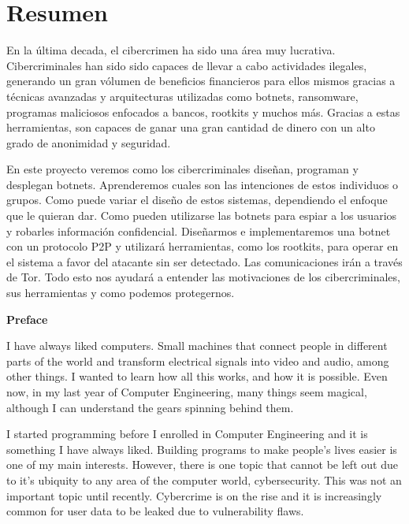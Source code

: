\documentclass[11pt, a4paper,twoside]{tesi_upf}
\begin{document}
\vspace*{\fill}
\section*{\Large \sffamily  Resumen}

En la última decada, el cibercrimen ha sido una área muy lucrativa. Cibercriminales han sido sido capaces de llevar a cabo actividades ilegales, generando un gran vólumen de beneficios financieros para ellos mismos gracias a técnicas avanzadas y arquitecturas utilizadas como botnets, ransomware, programas maliciosos enfocados a bancos, rootkits y muchos más. Gracias a estas herramientas, son capaces de ganar una gran cantidad de dinero con un alto grado de anonimidad y seguridad.

En este proyecto veremos como los cibercriminales diseñan, programan y desplegan botnets. Aprenderemos cuales son las intenciones de estos individuos o grupos. Como puede variar el diseño de estos sistemas, dependiendo el enfoque que le quieran dar. Como pueden utilizarse las botnets para espiar a los usuarios y robarles información confidencial. Diseñarmos e implementaremos una botnet con un protocolo P2P y utilizará herramientas, como los rootkits, para operar en el sistema a favor del atacante sin ser detectado. Las comunicaciones irán a través de Tor. Todo esto nos ayudará a entender las motivaciones de los cibercriminales, sus herramientas y como podemos protegernos.

\vspace*{\fill}

\cleardoublepage

{\bf Preface}

I have always liked computers. Small machines that connect people in different parts of the world and transform electrical signals into video and audio, among other things. I wanted to learn how all this works, and how it is possible. Even now, in my last year of Computer Engineering, many things seem magical, although I can understand the gears spinning behind them.

I started programming before I enrolled in Computer Engineering and it is something I have always liked. Building programs to make people's lives easier is one of my main interests.  However, there is one topic that cannot be left out due to it's ubiquity to any area of the computer world, cybersecurity. This was not an important topic until recently. Cybercrime is on the rise and it is increasingly common for user data to be leaked due to vulnerability flaws.
\end{document}
